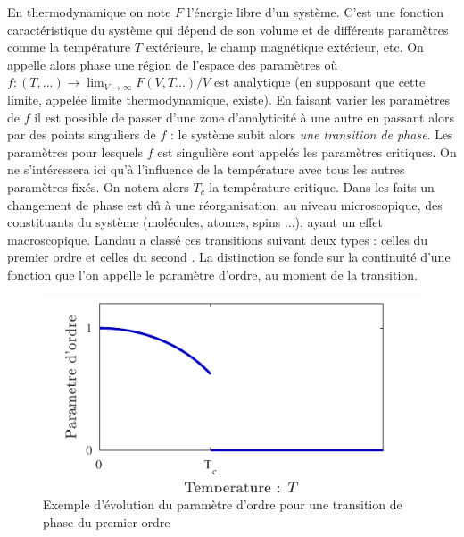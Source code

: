 \documentclass[10.5pt]{article}
\begin{document}
\begin{multicols*}{2}
En thermodynamique on note $F$ l'énergie libre d'un système. C'est une fonction caractéristique du système qui dépend de son volume et de différents paramètres comme la température $T$ extérieure, le champ magnétique extérieur, etc. On appelle alors phase une région de l'espace des paramètres où $f : (T, ...) \to \lim_{V \to \infty} F(V,T...)/V$ est analytique (en supposant que cette limite, appelée limite thermodynamique, existe). En faisant varier les paramètres de $f$ il est possible de passer d'une zone d'analyticité à une autre en passant alors par des points singuliers de $f$ : le système subit alors \textit{une transition de phase}. Les paramètres pour lesquels $f$ est singulière sont appelés les paramètres critiques. On ne s'intéressera ici qu'à l'influence de la température avec tous les autres paramètres fixés. On notera alors $T_c$ la température critique. Dans les faits un changement de phase est dû à une réorganisation, au niveau microscopique, des constituants  du système (molécules, atomes, spins ...), ayant un effet macroscopique. Landau a classé ces transitions suivant deux types : celles du premier ordre et celles du second \cite{toledano1987landau}. La distinction se fonde sur la continuité d'une fonction que l'on appelle le paramètre d'ordre, au moment de la transition. 
 \begin{figure}[H]
\begin{center}
\includegraphics[width=0.95\columnwidth]{aimantation2.pdf}
\caption{Exemple d'évolution du paramètre d'ordre pour une transition de phase du premier ordre}
\label{fig:aimantation2}
\end{center}
\end{figure}
\vspace*{-11pt}

\end{multicols*}
\end{document}
